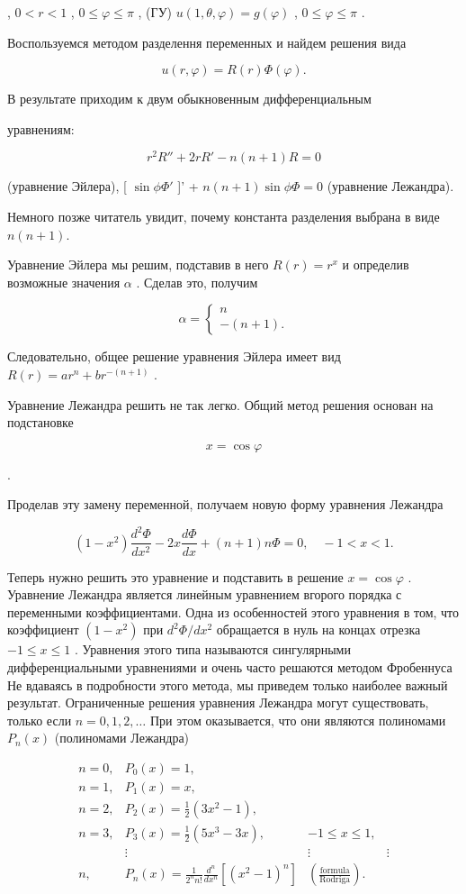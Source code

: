 \documentclass[
  ukrainian,
]{article}
\begin{document}
, \(0 < r < 1\) , \(0 \le \varphi \le \pi\) , (ГУ)
\(u(1, \theta, \varphi) = g(\varphi)\) , \(0 \le \varphi \le \pi\) .

Воспользуемся методом разделення переменных и найдем решения вида

\[
u(r, \varphi) = R(r) \Phi(\varphi).
\]

В результате приходим к двум обыкновенным дифференциальным

уравнениям:

\[
r^2R'' + 2rR' - n(n+1)R = 0
\]

(уравнение Эйлера), {[} \(\sin \phi \Phi'\) {]}' +
\(n(n+1)\sin \phi \Phi = 0\) (уравнение Лежандра).

Немного позже читатель увидит, почему константа разделения выбрана в
виде \(n(n+1)\).

Уравнение Эйлера мы решим, подставив в него \(R(r) = r^x\) и определив
возможные значения \(\alpha\) . Сделав это, получим

\[
\alpha = \begin{cases} n \\ -(n+1). \end{cases}
\]

Следовательно, общее решение уравнения Эйлера имеет вид
\(R(r) = ar^n + br^{-(n+1)}\) .

Уравнение Лежандра решить не так легко. Общий метод решения основан на
подстановке

\[
x = \cos \varphi
\]

.

Проделав эту замену переменной, получаем новую форму уравнения Лежандра

\[
(1-x^2)\frac{d^2\Phi}{dx^2} - 2x\frac{d\Phi}{dx} + (n+1)n\Phi = 0, \quad -1 < x < 1.
\]

Теперь нужно решить это уравнение и подставить в решение
\(x = \cos \varphi\) . Уравнение Лежандра является линейным уравнением
вгорого порядка с переменными коэффициентами. Одна из особенностей этого
уравнения в том, что коэффициент \((1-x^2)\) при \(d^2\Phi/dx^2\)
обращается в нуль на концах отрезка \(-1 \leqslant x \leqslant 1\) .
Уравнения этого типа называются сингулярными дифференциальными
уравнениями и очень часто решаются методом Фробеннуса Не вдаваясь в
подробности этого метода, мы приведем только наиболее важный результат.
Ограниченные решения уравнения Лежандра могут существовать, только если
\(n=0,1,2,\ldots\) При этом оказывается, что они являются полиномами
\(P_n(x)\) (полиномами Лежандра)

\[
\begin{array}{lll} n=0, & P_{0}(x)=1, \\ n=1, & P_{1}(x)=x, \\ n=2, & P_{2}(x)=\frac{1}{2}(3x^{2}-1), \\ n=3, & P_{3}(x)=\frac{1}{2}(5x^{3}-3x), & -1\leqslant x\leqslant 1, \\ & \vdots & \vdots & \vdots \\ n, & P_{n}(x)=\frac{1}{2^{n}n!}\frac{d^{n}}{dx^{n}}[(x^{2}-1)^{n}] & \left(\frac{\text{formula}}{\text{Rodriga}}\right). \end{array}
\]
\end{document}
